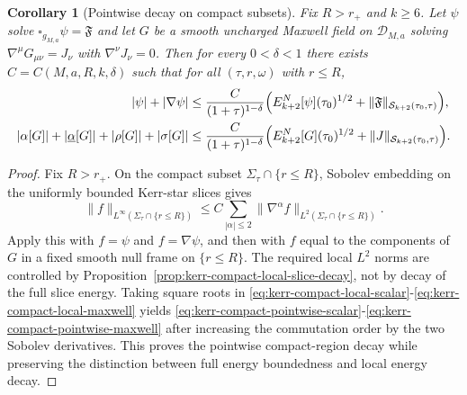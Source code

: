 \documentclass[11pt]{article}
\numberwithin{equation}{section}
\theoremstyle{plain}
\newtheorem{corollary}[theorem]{Corollary}
\theoremstyle{definition}
\theoremstyle{remark}
\begin{document}
\begin{corollary}[Pointwise decay on compact subsets]\label{cor:kerr-compact-pointwise}
Fix $R>r_{+}$ and $k\ge6$.
Let $\psi$ solve $\square_{g_{M,a}}\psi=\mathfrak{F}$ and let $G$ be a smooth uncharged Maxwell field on $\mathcal D_{M,a}$ solving $\nabla^{\mu}G_{\mu\nu}=J_{\nu}$ with $\nabla^{\nu}J_{\nu}=0$.
Then for every $0<\delta<1$ there exists $C=C(M,a,R,k,\delta)$ such that for all $(\tau,r,\omega)$ with $r\le R$,
\begin{eqnarray}
|\psi|+|\nabla\psi|
&\le
\frac{C}{(1+\tau)^{1-\delta}}
\Bigl(
E^{N}_{k+2}[\psi](\tau_{0})^{1/2}
+
\|\mathfrak{F}\|_{\mathcal S_{k+2}(\tau_{0},\tau)}
\Bigr),
\label{eq:kerr-compact-pointwise-scalar}\\
|\alpha[G]|+|\underline{\alpha}[G]|+|\rho[G]|+|\sigma[G]|
&\le
\frac{C}{(1+\tau)^{1-\delta}}
\Bigl(
E^{N}_{k+2}[G](\tau_{0})^{1/2}
+
\|J\|_{\mathcal S_{k+2}(\tau_{0},\tau)}
\Bigr).
\label{eq:kerr-compact-pointwise-maxwell}
\end{eqnarray}
\end{corollary}

\begin{proof}
Fix $R>r_{+}$. On the compact subset $\Sigma_{\tau}\cap\{r\le R\}$, Sobolev embedding on the uniformly bounded Kerr-star slices gives
\begin{equation}
\|f\|_{L^{\infty}(\Sigma_{\tau}\cap\{r\le R\})}
\le
C\sum_{|\alpha|\le2}\|\nabla^{\alpha}f\|_{L^{2}(\Sigma_{\tau}\cap\{r\le R\})}.
\end{equation}
Apply this with $f=\psi$ and $f=\nabla\psi$, and then with $f$ equal to the components of $G$ in a fixed smooth null frame on $\{r\le R\}$. The required local $L^{2}$ norms are controlled by Proposition~\ref{prop:kerr-compact-local-slice-decay}, not by decay of the full slice energy. Taking square roots in \eqref{eq:kerr-compact-local-scalar}-\eqref{eq:kerr-compact-local-maxwell} yields \eqref{eq:kerr-compact-pointwise-scalar}-\eqref{eq:kerr-compact-pointwise-maxwell} after increasing the commutation order by the two Sobolev derivatives. This proves the pointwise compact-region decay while preserving the distinction between full energy boundedness and local energy decay.
\end{proof}
\end{document}
